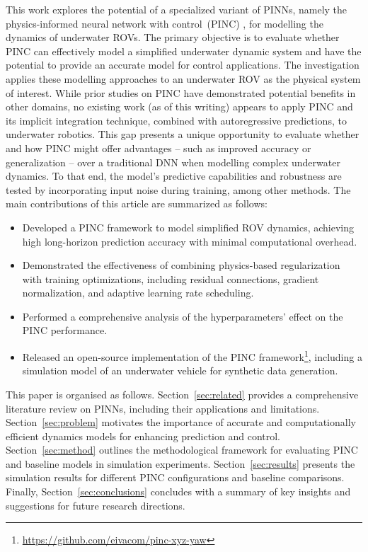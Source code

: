 \documentclass[conference]{IEEEtran}
\begin{document}
%
This work explores the potential of a specialized variant of PINNs, namely the physics-informed neural network with control~(PINC) \cite{antonelo_physics-informed_2024}, for modelling the dynamics of underwater ROVs. The primary objective is to evaluate whether PINC can effectively model a simplified underwater dynamic system and have the potential to provide an accurate model for control applications.
The investigation applies these modelling approaches to an underwater ROV as the physical system of interest. While prior studies on PINC have demonstrated potential benefits in other domains, no existing work (as of this writing) appears to apply PINC and its implicit integration technique, combined with autoregressive predictions, to underwater robotics. This gap presents a unique opportunity to evaluate whether and how PINC might offer advantages -- such as improved accuracy or generalization -- over a traditional DNN when modelling complex underwater dynamics. To that end, the model’s predictive capabilities and robustness are tested by incorporating input noise during training, among other methods. The main contributions of this article are summarized as follows:

\begin{itemize}
    \item Developed a PINC framework to model simplified ROV dynamics, achieving high long-horizon prediction accuracy with minimal computational overhead.
    \item Demonstrated the effectiveness of combining physics-based regularization with training optimizations, including residual connections, gradient normalization, and adaptive learning rate scheduling.
    \item Performed a comprehensive analysis of the hyperparameters' effect on the PINC performance.
    \item Released an open-source implementation of the PINC framework\footnote{\url{https://github.com/eivacom/pinc-xyz-yaw}}, including a simulation model of an underwater vehicle for synthetic data generation.
\end{itemize}

    


This paper is organised as follows. Section~\ref{sec:related} provides a comprehensive literature review on PINNs, including their applications and limitations. Section~\ref{sec:problem} motivates the importance of accurate and computationally efficient dynamics models for enhancing prediction and control. Section~\ref{sec:method} outlines the methodological framework for evaluating PINC and baseline models in simulation experiments. Section~\ref{sec:results} presents the simulation results for different PINC configurations and baseline comparisons. Finally, Section~\ref{sec:conclusions} concludes with a summary of key insights and suggestions for future research directions.
\end{document}
